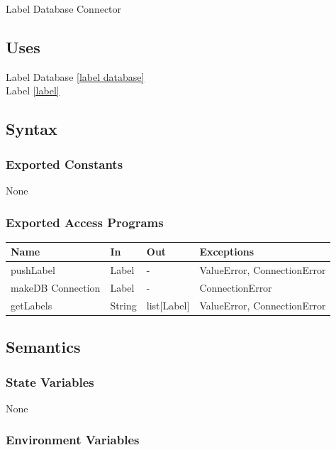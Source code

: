 \documentclass[12pt, titlepage]{article}
\begin{document}
  Label Database Connector

  
  \subsection{Uses}
  
  Label Database \ref{label database}\\
  Label \ref{label}\\ 

  
  \subsection{Syntax}


  
  \subsubsection{Exported Constants}
  None
  \subsubsection{Exported Access Programs}
  
  \begin{center}
  \begin{tabular}{p{2cm} p{4cm} p{4cm} p{2cm}}
  \hline
  \textbf{Name} & \textbf{In} & \textbf{Out} & \textbf{Exceptions} \\
  \hline
  pushLabel & Label & - & ValueError, ConnectionError \\
  \hline
  makeDB Connection & Label & - & ConnectionError \\
  \hline
  getLabels & String & list[Label] & ValueError, ConnectionError \\
  \hline
  \end{tabular}
  \end{center}
  
  \subsection{Semantics}
  
  \subsubsection{State Variables}
  
  None
  
  \subsubsection{Environment Variables}
  
\end{document}
